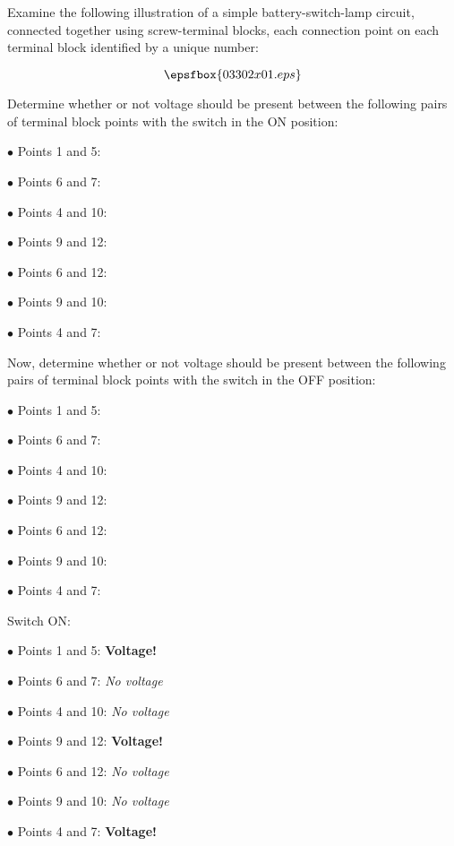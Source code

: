 

Examine the following illustration of a simple battery-switch-lamp circuit, connected together using screw-terminal blocks, each connection point on each terminal block identified by a unique number:

$$\epsfbox{03302x01.eps}$$

\goodbreak
Determine whether or not voltage should be present between the following pairs of terminal block points with the switch in the ON position:

\medskip
\item{$\bullet$} Points 1 and 5:
\item{$\bullet$} Points 6 and 7:
\item{$\bullet$} Points 4 and 10:
\item{$\bullet$} Points 9 and 12:
\item{$\bullet$} Points 6 and 12:
\item{$\bullet$} Points 9 and 10:
\item{$\bullet$} Points 4 and 7:
\medskip

\goodbreak
Now, determine whether or not voltage should be present between the following pairs of terminal block points with the switch in the OFF position:

\medskip
\item{$\bullet$} Points 1 and 5:
\item{$\bullet$} Points 6 and 7:
\item{$\bullet$} Points 4 and 10:
\item{$\bullet$} Points 9 and 12:
\item{$\bullet$} Points 6 and 12:
\item{$\bullet$} Points 9 and 10:
\item{$\bullet$} Points 4 and 7:
\medskip







Switch ON:

\medskip
\goodbreak
\item{$\bullet$} Points 1 and 5: {\bf Voltage!}
\item{$\bullet$} Points 6 and 7: {\it No voltage}
\item{$\bullet$} Points 4 and 10: {\it No voltage}
\item{$\bullet$} Points 9 and 12: {\bf Voltage!}
\item{$\bullet$} Points 6 and 12: {\it No voltage}
\item{$\bullet$} Points 9 and 10: {\it No voltage}
\item{$\bullet$} Points 4 and 7: {\bf Voltage!}
\medskip

